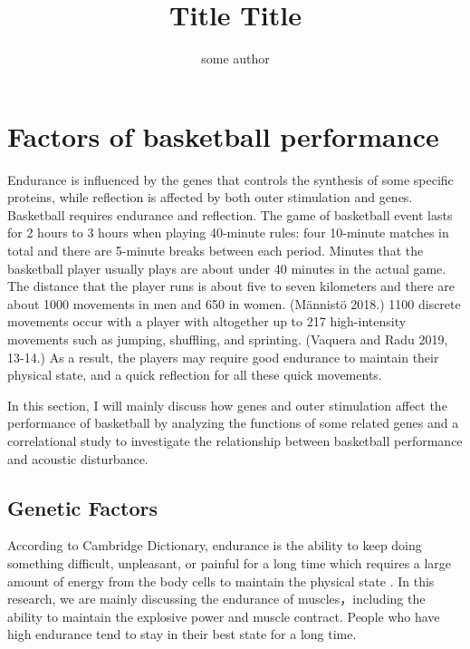 \documentclass{article}
\title{Title Title}
\author{some author}
\begin{document}
\maketitle

\section{Factors of basketball performance}



Endurance is influenced by the genes that controls the synthesis of some specific proteins, while reflection is affected by both outer stimulation and genes. Basketball requires endurance and reflection. The game of basketball event lasts for 2 hours to 3 hours when playing 40-minute rules: four 10-minute matches in total and there are 5-minute breaks between each period. Minutes that the basketball player usually plays are about under 40 minutes in the actual game. The distance that the player runs is about five to seven kilometers and there are about 1000 movements in men and 650 in women. (Männistö 2018.) 1100 discrete movements occur with a player with altogether up to 217 high-intensity movements such as jumping, shuffling, and sprinting. (Vaquera and Radu 2019, 13-14.) As a result, the players may require good endurance to maintain their physical state, and a quick reflection for all these quick movements. 

In this section, I will mainly discuss how genes and outer stimulation affect the performance of basketball by analyzing the functions of some related genes and a correlational study to investigate the relationship between basketball performance and acoustic disturbance.

\subsection{Genetic Factors}

According to Cambridge Dictionary, endurance is the ability to keep doing something difficult, unpleasant, or painful for a long time which requires a large amount of energy from the body cells to maintain the physical state . In this research, we are mainly discussing the endurance of muscles，including the ability to maintain the explosive power and muscle contract. People who have high endurance tend to stay in their best state for a long time. 
\end{document}
